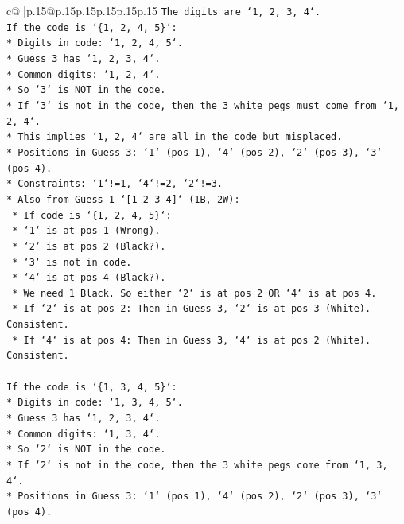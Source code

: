 \documentclass{article}
\begin{document}
{\begin{supertabular}{c@{$\;$}|p{.15\linewidth}@{}p{.15\linewidth}p{.15\linewidth}p{.15\linewidth}p{.15\linewidth}p{.15\linewidth}}
{{{\texttt{The digits are `1, 2, 3, 4`.} \\
\texttt{If the code is `\{1, 2, 4, 5\}`:} \\
\texttt{*   Digits in code: `1, 2, 4, 5`.} \\
\texttt{*   Guess 3 has `1, 2, 3, 4`.} \\
\texttt{*   Common digits: `1, 2, 4`.} \\
\texttt{*   So `3` is NOT in the code.} \\
\texttt{*   If `3` is not in the code, then the 3 white pegs must come from `1, 2, 4`.} \\
\texttt{*   This implies `1, 2, 4` are all in the code but misplaced.} \\
\texttt{*   Positions in Guess 3: `1` (pos 1), `4` (pos 2), `2` (pos 3), `3` (pos 4).} \\
\texttt{*   Constraints: `1`!=1, `4`!=2, `2`!=3.} \\
\texttt{*   Also from Guess 1 `{[}1 2 3 4{]}` (1B, 2W):} \\
\texttt{    *   If code is `\{1, 2, 4, 5\}`:} \\
\texttt{        *   `1` is at pos 1 (Wrong).} \\
\texttt{        *   `2` is at pos 2 (Black?).} \\
\texttt{        *   `3` is not in code.} \\
\texttt{        *   `4` is at pos 4 (Black?).} \\
\texttt{        *   We need 1 Black. So either `2` is at pos 2 OR `4` is at pos 4.} \\
\texttt{        *   If `2` is at pos 2: Then in Guess 3, `2` is at pos 3 (White). Consistent.} \\
\texttt{        *   If `4` is at pos 4: Then in Guess 3, `4` is at pos 2 (White). Consistent.} \\
\\ 
\texttt{If the code is `\{1, 3, 4, 5\}`:} \\
\texttt{*   Digits in code: `1, 3, 4, 5`.} \\
\texttt{*   Guess 3 has `1, 2, 3, 4`.} \\
\texttt{*   Common digits: `1, 3, 4`.} \\
\texttt{*   So `2` is NOT in the code.} \\
\texttt{*   If `2` is not in the code, then the 3 white pegs come from `1, 3, 4`.} \\
\texttt{*   Positions in Guess 3: `1` (pos 1), `4` (pos 2), `2` (pos 3), `3` (pos 4).} \\
}}}
\end{supertabular}}
\end{document}
